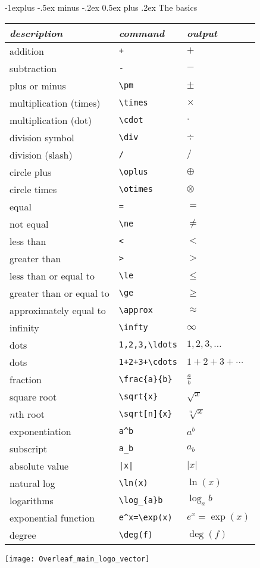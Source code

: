 \documentclass[10pt,landscape,letterpaper]{article}
\makeatletter
\renewcommand{\subsection}{\@startsection{subsection}{2}{0mm}%
                                {-1explus -.5ex minus -.2ex}%
                                {0.5ex plus .2ex}%
                                {\sffamily\normalsize\itshape}}
\makeatother
\begin{document}
\begin{multicols}{3}
\subsection{The basics}
\begin{tabular}{lll}
\toprule
\emph{description} & \emph{command} & \emph{output}\\
\midrule
addition & \verb!+! & $+$\\
subtraction & \verb!-! & $-$\\
plus or minus & \verb!\pm! & $\pm$\\
multiplication (times) & \verb!\times! & $\times$\\
multiplication (dot) & \verb!\cdot! & $\cdot$\\
division symbol & \verb!\div! & $\div$\\
division (slash) & \verb!/! & $/$\\
circle plus & \verb!\oplus! & $\oplus$\\
circle times & \verb!\otimes! & $\otimes$\\
equal & \verb!=! & $=$\\
not equal & \verb!\ne! & $\ne$\\
less than & \verb!<! & $<$\\
greater than & \verb!>! & $>$\\
less than or equal to & \verb!\le! & $\le$\\
greater than or equal to & \verb!\ge! & $\ge$\\
approximately equal to & \verb!\approx! & $\approx$\\
infinity & \verb!\infty! & $\infty$\\
dots & \verb!1,2,3,\ldots! & $1,2,3,\ldots$\\
dots & \verb!1+2+3+\cdots! & $1+2+3+\cdots$\\
fraction & \verb!\frac{a}{b}! & $\frac{a}{b}$\\
square root & \verb!\sqrt{x}! & $\sqrt{x}$\\
$n$th root & \verb!\sqrt[n]{x}! & $\sqrt[n]{x}$\\
exponentiation & \verb!a^b! & $a^{b}$\\
subscript & \verb!a_b! & $a_{b}$\\
absolute value & \verb!|x|! & $|x|$\\
natural log  & \verb!\ln(x)! & $\ln(x)$\\
logarithms & \verb!\log_{a}b! & $\log_{a}b$\\
exponential function & \verb!e^x=\exp(x)! & $e^{x}=\exp(x)$\\
degree & \verb!\deg(f)! & $\deg(f)$\\
\bottomrule
\end{tabular}
\vfill
{\hfill\texttt{[image: Overleaf\_main\_logo\_vector]}\hfill}
\newpage


\end{multicols}
\end{document}
